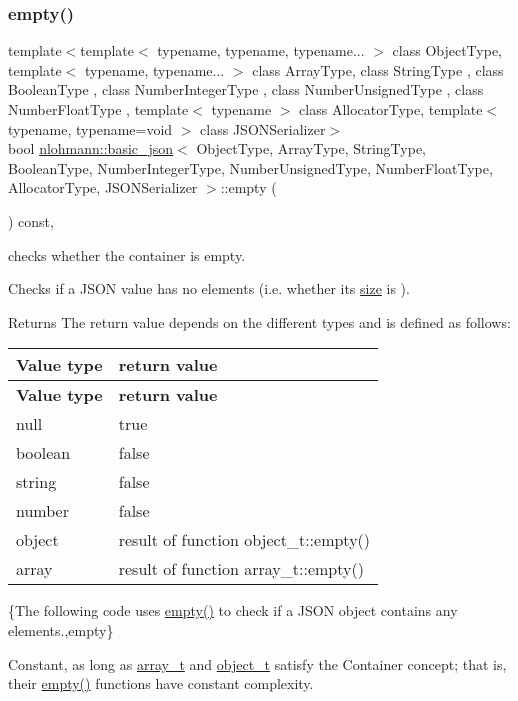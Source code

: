 \subsubsection{\texorpdfstring{empty()}{empty()}}
{\footnotesize\ttfamily template$<$template$<$ typename, typename, typename... $>$ class Object\+Type, template$<$ typename, typename... $>$ class Array\+Type, class String\+Type , class Boolean\+Type , class Number\+Integer\+Type , class Number\+Unsigned\+Type , class Number\+Float\+Type , template$<$ typename $>$ class Allocator\+Type, template$<$ typename, typename=void $>$ class J\+S\+O\+N\+Serializer$>$ \\
bool \hyperlink{classnlohmann_1_1basic__json}{nlohmann\+::basic\+\_\+json}$<$ Object\+Type, Array\+Type, String\+Type, Boolean\+Type, Number\+Integer\+Type, Number\+Unsigned\+Type, Number\+Float\+Type, Allocator\+Type, J\+S\+O\+N\+Serializer $>$\+::empty (\begin{DoxyParamCaption}{ }\end{DoxyParamCaption}) const\hspace{0.3cm}{\ttfamily [inline]}, {\ttfamily [noexcept]}}



checks whether the container is empty. 

Checks if a J\+S\+ON value has no elements (i.\+e. whether its \hyperlink{classnlohmann_1_1basic__json_a25e27ad0c6d53c01871c5485e1f75b96}{size} is {}).

\begin{DoxyReturn}{Returns}
The return value depends on the different types and is defined as follows\+: \tabulinesep=1mm
\begin{longtabu} spread 0pt [c]{*{2}{|X[-1]}|}
\hline
\rowcolor{\tableheadbgcolor}\textbf{ Value type }&\textbf{ return value  }\\
\endfirsthead
\hline
\endfoot
\hline
\rowcolor{\tableheadbgcolor}\textbf{ Value type }&\textbf{ return value  }\\
\endhead
null &{\ttfamily true} \\
boolean &{\ttfamily false} \\
string &{\ttfamily false} \\
number &{\ttfamily false} \\
object &result of function {\ttfamily object\+\_\+t\+::empty()} \\
array &result of function {\ttfamily array\+\_\+t\+::empty()} \\
\end{longtabu}
\{The following code uses {\ttfamily \hyperlink{classnlohmann_1_1basic__json_a1a86d444bfeaa9518d2421aedd74444a}{empty()}} to check if a J\+S\+ON object contains any elements.,empty\}
\end{DoxyReturn}
Constant, as long as \hyperlink{classnlohmann_1_1basic__json_ae095578e03df97c5b3991787f1056374}{array\+\_\+t} and \hyperlink{classnlohmann_1_1basic__json_a5e48a7893520e1314bf0c9723e26ea2a}{object\+\_\+t} satisfy the Container concept; that is, their {\ttfamily \hyperlink{classnlohmann_1_1basic__json_a1a86d444bfeaa9518d2421aedd74444a}{empty()}} functions have constant complexity.

